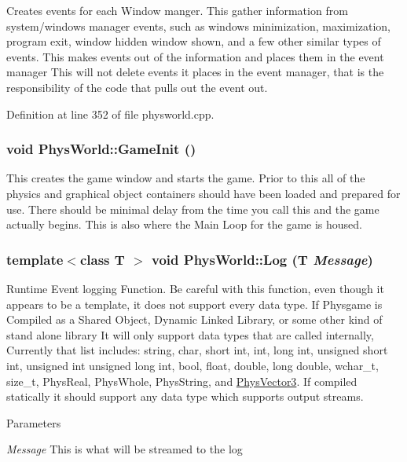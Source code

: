 Creates events for each Window manger. This gather information from system/windows manager events, such as windows minimization, maximization, program exit, window hidden window shown, and a few other similar types of events. This makes events out of the information and places them in the event manager This will not delete events it places in the event manager, that is the responsibility of the code that pulls out the event out. 

Definition at line 352 of file physworld.cpp.\hypertarget{classPhysWorld_a6d65a7412c1711497fbd1173f879243a}{
\subsubsection[{GameInit}]{\setlength{\rightskip}{0pt plus 5cm}void PhysWorld::GameInit ()}}
\label{db/df5/classPhysWorld_a6d65a7412c1711497fbd1173f879243a}


This creates the game window and starts the game. Prior to this all of the physics and graphical object containers should have been loaded and prepared for use. There should be minimal delay from the time you call this and the game actually begins. This is also where the Main Loop for the game is housed. \hypertarget{classPhysWorld_a5e9fead1c3100f5dbd5ca985b82b85ea}{
\subsubsection[{Log}]{\setlength{\rightskip}{0pt plus 5cm}template$<$class T $>$ void PhysWorld::Log (T {\em Message})}}
\label{db/df5/classPhysWorld_a5e9fead1c3100f5dbd5ca985b82b85ea}


Runtime Event logging Function. Be careful with this function, even though it appears to be a template, it does not support every data type. If Physgame is Compiled as a Shared Object, Dynamic Linked Library, or some other kind of stand alone library It will only support data types that are called internally, Currently that list includes: string, char, short int, int, long int, unsigned short int, unsigned int unsigned long int, bool, float, double, long double, wchar\_\-t, size\_\-t, PhysReal, PhysWhole, PhysString, and \hyperlink{classPhysVector3}{PhysVector3}. If compiled statically it should support any data type which supports output streams. 
\begin{DoxyParams}{Parameters}
\item[{\em Message}]This is what will be streamed to the log \end{DoxyParams}


